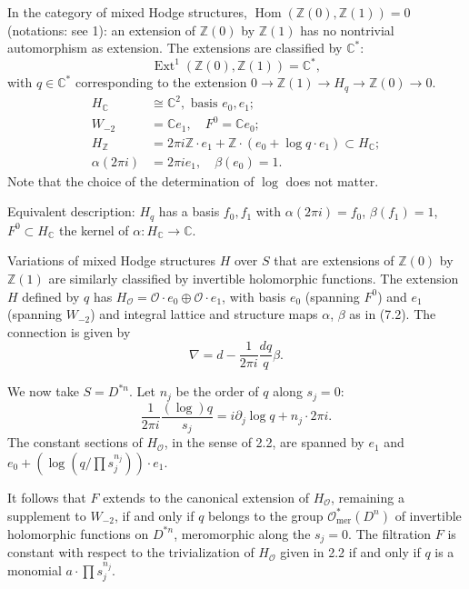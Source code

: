 \documentclass[11pt,a4paper]{article}
\theoremstyle{plain}
\theoremstyle{definition}
\DeclareMathOperator{\Ext}{Ext}
\DeclareMathOperator{\Hom}{Hom}
\begin{document}
In the category of mixed Hodge structures, $\Hom(\mathbb{Z}(0), \mathbb{Z}(1)) = 0$ (notations: see 1): an extension of $\mathbb{Z}(0)$ by $\mathbb{Z}(1)$ has no nontrivial automorphism as extension. The extensions are classified by $\mathbb{C}^{*}$:
\begin{equation}
\Ext^{1}(\mathbb{Z}(0), \mathbb{Z}(1)) = \mathbb{C}^{*}, \tag{7.1}
\end{equation}
with $q \in \mathbb{C}^{*}$ corresponding to the extension $0 \to \mathbb{Z}(1) \to H_{q} \to \mathbb{Z}(0) \to 0$.
\begin{equation}
\begin{aligned}
H_{\mathbb{C}} &\cong \mathbb{C}^{2}, \text{ basis } e_{0}, e_{1}; \\
W_{-2} &= \mathbb{C}e_{1}, \quad F^{0} = \mathbb{C}e_{0}; \\
H_{\mathbb{Z}} &= 2\pi i \mathbb{Z} \cdot e_{1} + \mathbb{Z} \cdot (e_{0} + \log q \cdot e_{1}) \subset H_{\mathbb{C}}; \\
\alpha(2\pi i) &= 2\pi i e_{1}, \quad \beta(e_{0}) = 1.
\end{aligned} \tag{7.2}
\end{equation}
Note that the choice of the determination of $\log$ does not matter.

Equivalent description: $H_{q}$ has a basis $f_{0}, f_{1}$ with $\alpha(2\pi i) = f_{0}$, $\beta(f_{1}) = 1$, $F^{0} \subset H_{\mathbb{C}}$ the kernel of $\alpha: H_{\mathbb{C}} \to \mathbb{C}$.

Variations of mixed Hodge structures $H$ over $S$ that are extensions of $\mathbb{Z}(0)$ by $\mathbb{Z}(1)$ are similarly classified by invertible holomorphic functions. The extension $H$ defined by $q$ has $H_{\mathcal{O}} = \mathcal{O} \cdot e_{0} \oplus \mathcal{O} \cdot e_{1}$, with basis $e_{0}$ (spanning $F^{0}$) and $e_{1}$ (spanning $W_{-2}$) and integral lattice and structure maps $\alpha$, $\beta$ as in (7.2). The connection is given by
\begin{equation}
\nabla = d - \frac{1}{2\pi i}\frac{dq}{q}\beta. \tag{7.3}
\end{equation}

We now take $S = D^{*n}$. Let $n_{j}$ be the order of $q$ along $s_{j} = 0$:
\[
\frac{1}{2\pi i}\frac{(\log)q}{s_{j}} = i\partial_{j}\log q + n_{j} \cdot 2\pi i.
\]
The constant sections of $H_{\mathcal{O}}$, in the sense of 2.2, are spanned by $e_{1}$ and $e_{0} + (\log(q/\prod s_{j}^{n_{j}})) \cdot e_{1}$.

It follows that $F$ extends to the canonical extension of $H_{\mathcal{O}}$, remaining a supplement to $W_{-2}$, if and only if $q$ belongs to the group $\mathcal{O}_{\text{mer}}^{*}(D^{n})$ of invertible holomorphic functions on $D^{*n}$, meromorphic along the $s_{j} = 0$. The filtration $F$ is constant with respect to the trivialization of $H_{\mathcal{O}}$ given in 2.2 if and only if $q$ is a monomial $a \cdot \prod s_{j}^{n_{j}}$.
\end{document}
